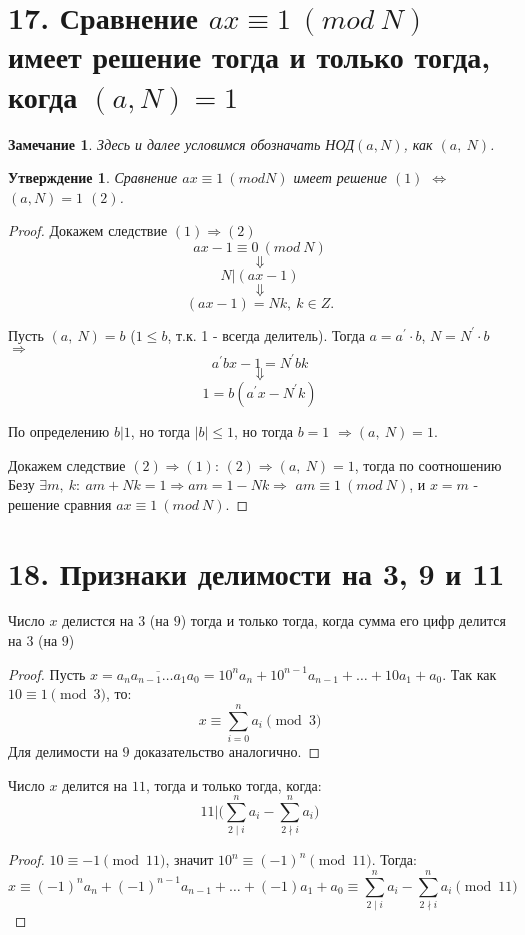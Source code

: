 \documentclass[a4paper,12pt]{article}
\newtheorem*{Note}{Замечание}
\newtheorem*{state}{Утверждение}
\newcommand{\p}{^{\prime}}
\begin{document}
	\section*{17. Сравнение $ax \equiv 1\ (mod\ N)$ имеет решение тогда и только тогда, когда $(a, N) = 1$}
		\begin{Note} Здесь и далее условимся обозначать НОД$(a, N)$, как $(a,\ N)$.
		\end{Note}
		\begin{state}
		Сравнение $ax \equiv 1\ (mod N)$ имеет решение $(1)$ $\Leftrightarrow$ $(a, N) = 1$ $(2)$.
		\end{state}
		\begin{proof}
		Докажем следствие $(1) \Rightarrow (2)$
		$$ax - 1\equiv 0\ (mod\ N)$$
		$$\Downarrow$$
		$$N | (ax - 1)$$
		$$\Downarrow$$
		$$(ax - 1) = Nk,\ k \in Z.$$

		Пусть $(a,\ N) = b$ ($1 \leqslant b$, т.к. 1 - всегда делитель).
		Тогда $a = a\p \cdot b$, $N = N\p \cdot b$ $\Rightarrow$
		$$a\p bx - 1 = N\p bk$$
		$$\Downarrow$$
		$$1 = b(a\p x - N\p k)$$

		По определению $b|1$, но тогда $|b| \leqslant 1$, но тогда $b = 1$ $\Rightarrow$$(a,\ N) = 1$.

		Докажем следствие $(2) \Rightarrow (1)$: $(2) \Rightarrow (a,\ N) = 1$, тогда по соотношению Безу $\exists m,\ k:\ am + Nk = 1 \Rightarrow am = 1 - Nk \Rightarrow$ $am \equiv 1\ (mod\ N)$, и $x=m$ - решение сравния $ax \equiv 1\ (mod\ N)$.
		\end{proof}

		\section*{18. Признаки делимости на 3, 9 и 11}

        Число $x$ делистся на $3$ (на $9$) тогда и только тогда, когда сумма его цифр делится на $3$ (на $9$)
        \begin{proof}
            Пусть $x = \overline{a_{n}a_{n - 1}\ldots a_{1}a_{0}} = 10^{n}a_{n} + 10^{n - 1}a_{n - 1} + \ldots + 10a_{1} + a_{0}$. Так как\\
            $10 \equiv 1 \pmod 3$, то:
            \[
                x \equiv \sum_{i = 0}^{n} a_{i} \pmod 3
            \]
            Для делимости на $9$ доказательство аналогично.
        \end{proof}
        Число $x$ делится на $11$, тогда и только тогда, когда:
        \[
        	11 | \bigg(\sum_{2 \mid i}^{n} a_{i} - \sum_{2 \nmid i}^{n} a_{i}\bigg)
        \]
        \begin{proof}
        	$10 \equiv -1 \pmod{11}$, значит $10^{n} \equiv (-1)^{n} \pmod{11}$. Тогда:
        	\[
        		x \equiv (-1)^{n}a_{n} + (-1)^{n - 1}a_{n - 1} + \ldots + (-1)a_{1} + a_{0} \equiv \sum_{2 \mid i}^{n} a_{i} - \sum_{2 \nmid i}^{n} a_{i} \pmod{11}
        	\]
        \end{proof}
\end{document}
